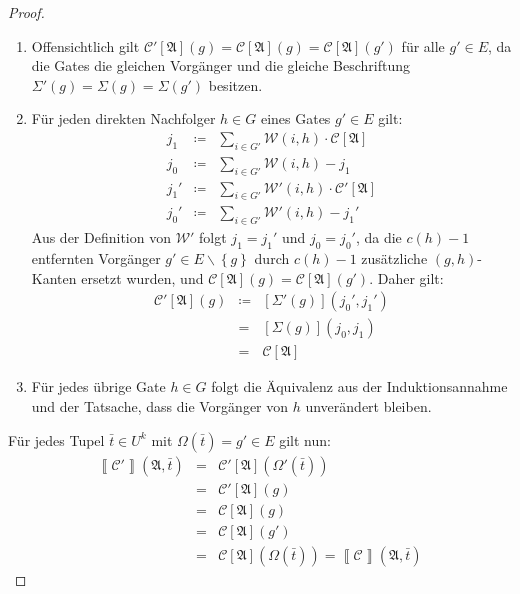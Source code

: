 \begin{proof}
\begin{enumerate}
\item Offensichtlich gilt $\mathcal{C}'\left[\mathfrak{A}\right]\left(g\right)=\mathcal{C}\left[\mathfrak{A}\right]\left(g\right)=\mathcal{C}\left[\mathfrak{A}\right]\left(g'\right)$
für alle $g'\in E$, da die Gates die gleichen Vorgänger und die gleiche
Beschriftung $\Sigma'\left(g\right)=\Sigma\left(g\right)=\Sigma\left(g'\right)$
besitzen.
\item Für jeden direkten Nachfolger $h\in G$ eines Gates $g'\in E$ gilt:
\begin{eqnarray*}
j_{1} & \coloneqq & \sum_{i\in G'}\mathcal{W}\left(i,h\right)\cdot\mathcal{C}\left[\mathfrak{A}\right]\\
j_{0} & \coloneqq & \sum_{i\in G'}\mathcal{W}\left(i,h\right)-j_{1}\\
j_{1}' & \coloneqq & \sum_{i\in G'}\mathcal{W}'\left(i,h\right)\cdot\mathcal{C}'\left[\mathfrak{A}\right]\\
j_{0}' & \coloneqq & \sum_{i\in G'}\mathcal{W}'\left(i,h\right)-j_{1}'
\end{eqnarray*}
Aus der Definition von $\mathcal{W}'$ folgt $j_{1}=j_{1}'$ und $j_{0}=j_{0}'$,
da die $c\left(h\right)-1$ entfernten Vorgänger $g'\in E\backslash\left\{ g\right\} $
durch $c\left(h\right)-1$ zusätzliche $\left(g,h\right)$-Kanten
ersetzt wurden, und $\mathcal{C}\left[\mathfrak{A}\right]\left(g\right)=\mathcal{C}\left[\mathfrak{A}\right]\left(g'\right)$.
Daher gilt: 
\begin{eqnarray*}
\mathcal{C}'\left[\mathfrak{A}\right]\left(g\right) & \coloneqq & \left[\Sigma'\left(g\right)\right]\left(j_{0}',j_{1}'\right)\\
 & = & \left[\Sigma\left(g\right)\right]\left(j_{0},j_{1}\right)\\
 & = & \mathcal{C}\left[\mathfrak{A}\right]
\end{eqnarray*}
\item Für jedes übrige Gate $h\in G$ folgt die Äquivalenz aus der Induktionsannahme
und der Tatsache, dass die Vorgänger von $h$ unverändert bleiben.
\end{enumerate}
Für jedes Tupel $\bar{t}\in U^{k}$ mit $\Omega\left(\bar{t}\right)=g'\in E$
gilt nun:
\begin{eqnarray*}
\left\llbracket \mathcal{C}'\right\rrbracket \left(\mathfrak{A},\bar{t}\right) & = & \mathcal{C}'\left[\mathfrak{A}\right]\left(\Omega'\left(\bar{t}\right)\right)\\
 & = & \mathcal{C}'\left[\mathfrak{A}\right]\left(g\right)\\
 & = & \mathcal{C}\left[\mathfrak{A}\right]\left(g\right)\\
 & = & \mathcal{C}\left[\mathfrak{A}\right]\left(g'\right)\\
 & = & \mathcal{C}\left[\mathfrak{A}\right]\left(\Omega\left(\bar{t}\right)\right)=\left\llbracket \mathcal{C}\right\rrbracket \left(\mathfrak{A},\bar{t}\right)
\end{eqnarray*}


\end{proof}
